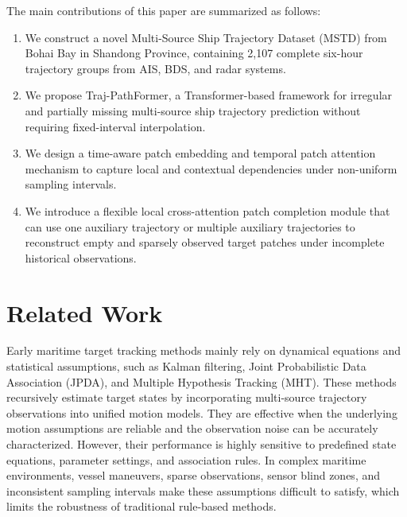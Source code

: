 \documentclass[a4paper,fleqn]{cas-dc}
\begin{document}
The main contributions of this paper are summarized as follows:

\begin{enumerate}
    \item We construct a novel Multi-Source Ship Trajectory Dataset (MSTD) from Bohai Bay in Shandong Province, containing 2,107 complete six-hour trajectory groups from AIS, BDS, and radar systems.
    \item We propose Traj-PathFormer, a Transformer-based framework for irregular and partially missing multi-source ship trajectory prediction without requiring fixed-interval interpolation.
    \item We design a time-aware patch embedding and temporal patch attention mechanism to capture local and contextual dependencies under non-uniform sampling intervals.
    \item We introduce a flexible local cross-attention patch completion module that can use one auxiliary trajectory or multiple auxiliary trajectories to reconstruct empty and sparsely observed target patches under incomplete historical observations.
\end{enumerate}

\section{Related Work}

Early maritime target tracking methods mainly rely on dynamical equations and statistical assumptions, such as Kalman filtering, Joint Probabilistic Data Association (JPDA), and Multiple Hypothesis Tracking (MHT). These methods recursively estimate target states by incorporating multi-source trajectory observations into unified motion models. They are effective when the underlying motion assumptions are reliable and the observation noise can be accurately characterized. However, their performance is highly sensitive to predefined state equations, parameter settings, and association rules. In complex maritime environments, vessel maneuvers, sparse observations, sensor blind zones, and inconsistent sampling intervals make these assumptions difficult to satisfy, which limits the robustness of traditional rule-based methods.
\end{document}
